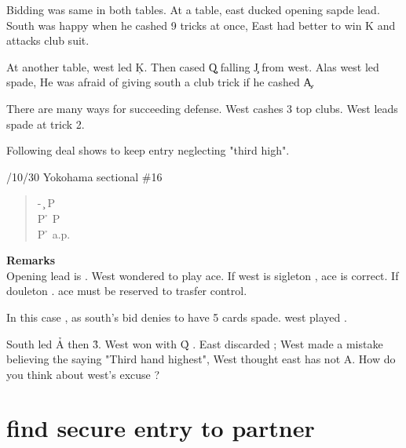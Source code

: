 Bidding was same in both tables. At a table, east ducked 
opening sapde lead. South was happy when he cashed 9 tricks 
at once, East had better to win  \s K and attacks club suit.

At another table, west led \c K. Then cased \c Q falling \c J from west.
Alas west led spade, He was afraid of giving south a club trick 
if he cashed \c A.

There are many ways for succeeding defense.
West cashes 3 top clubs. West leads spade at trick 2. 


Following deal shows to keep entry neglecting
"third high".

\vspace{0.5cm}
/10/30 Yokohama sectional \#16
\begin{quote}
%
  {}%
  {}
  {}%
  {}%
\end{quote}
\begin{quote}
\begin{bidding}
- \c  \> P  \h  \\
P \h \> P  \h\\
P \h \> a.p.
\end{bidding}
\end{quote}

{\bf Remarks}\\

Opening lead is . West wondered to play ace.
If west is sigleton , ace is correct. If douleton . ace must
be reserved to trasfer control.

In this case , as south's bid denies to have 5 cards spade.
west played .

South led \h  A then  \h 3. West won with \h Q . East discarded ;
West made a mistake believing the saying "Third hand highest", West
thought east has not \s A. How do you think about west's excuse ?




\section{find secure entry to partner}

